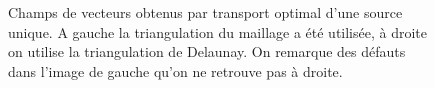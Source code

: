 \documentclass[11pt]{article}
\begin{document}
	
	\begin{figure}
		\centering
		\vspace{-5pt}
		\caption{Champs de vecteurs obtenus par transport optimal d'une source unique. A gauche la triangulation du maillage a été utilisée, à droite on utilise la triangulation de Delaunay. On remarque des défauts dans l'image de gauche qu'on ne retrouve pas à droite.}
		\label{fig:orientation_delaunay}
	\end{figure}
\end{document}
